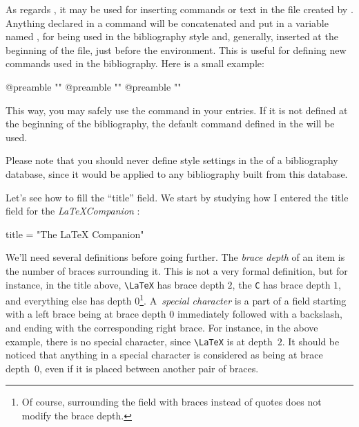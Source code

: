As regards , it may be used for inserting commands or
text in the file created by \bt. Anything declared in a 
command will be concatenated and put in a variable named
, for being used in the bibliography style and,
generally, inserted at the beginning of the  file, just
before the  environment. This is useful for
defining new commands used in the bibliography. Here is a small
example:
\begin{verbatimtab}
@preamble{ "\makeatletter" }
@preamble{ "" }
@preamble{ "\makeatother" }
\end{verbatimtab}
This way, you may safely use the  command in your
entries. If it is not defined at the beginning of the bibliography, the
default command defined in the  will be used.  

Please note that you should never define style settings
in the  of a bibliography database, 
since it would be applied to
any bibliography built from this database.






\label{title}

Let's see how to fill the ``title'' field. We start by studying how I entered
the title field for the  
\emph{\LaTeX Companion} : 
\begin{verbatimtab}
  title 	= "The {{\LaTeX}} {C}ompanion"
\end{verbatimtab}

We'll need several definitions before going further.
The \emph{brace depth} of an item is the number of braces surrounding
it. This is not a very formal definition, but for instance, in
the title above, \verb+\LaTeX+ has brace depth $2$, the \verb+C+ has
brace depth $1$, and everything else has depth $0$\footnote{Of course,
surrounding the field with braces instead of quotes does not modify
the brace depth.}.
A~\emph{special character} is a part of a field starting with a left 
brace
being at brace depth $0$ immediately 
followed with a backslash, and ending 
with the corresponding right brace. 
For instance, in the above example, there is
no special character, since \verb+\LaTeX+ is at depth~$2$. It should
be noticed that anything in a special character is considered as being at
brace depth~$0$, even if it is placed between another pair of braces.


